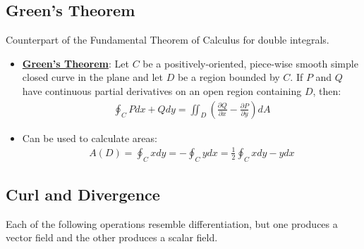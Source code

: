 \documentclass[reqno,11pt]{amsart}
\theoremstyle{definition}
\theoremstyle{remark}
\newcommand{\dfn}[1]{\underline{\textbf{#1}}}
\begin{document}
\subsection{Green's Theorem}
Counterpart of the Fundamental Theorem of Calculus for double integrals.
\begin{itemize}[noitemsep]
	\item \dfn{Green's Theorem}: Let $C$ be a positively-oriented, piece-wise smooth simple closed curve in the plane and let $D$ be a region bounded by $C$. If $P$ and $Q$ have continuous partial derivatives on an open region containing $D$, then:
	\begin{align}
		\oint_C Pdx + Qdy = \iint_D \left( \frac{\partial Q}{\partial x} - \frac{\partial P}{\partial y} \right) dA 	
	\end{align}
	\item Can be used to calculate areas: 
	\begin{align}
		A(D) = \oint_C x dy = - \oint_C y dx = \frac{1}{2} \oint_C x dy - y dx 	
	\end{align}
\end{itemize}

\subsection{Curl and Divergence}
Each of the following operations resemble differentiation, but one produces a vector field and the other produces a scalar field. 
\end{document}

